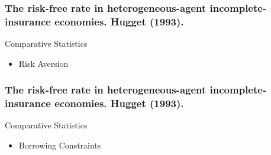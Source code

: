 \documentclass{beamer}
\begin{document}
\frame
{
  \frametitle{ The risk-free rate in heterogeneous-agent incomplete-insurance economies. Hugget (1993).}
Comparative Statistics 
\begin{itemize}
\item Risk Aversion
\end{itemize}
}

\frame
{
  \frametitle{ The risk-free rate in heterogeneous-agent incomplete-insurance economies. Hugget (1993).}
Comparative Statistics 
\begin{itemize}
\item Borrowing Constraints
\end{itemize}
}
\end{document}
